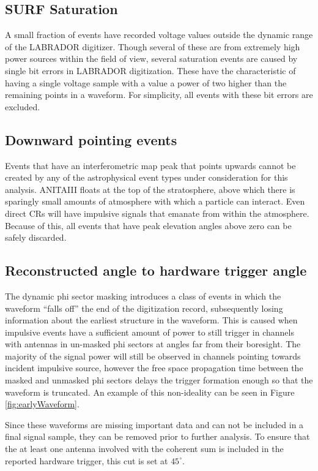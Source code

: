 	\subsection{SURF Saturation}
		A small fraction of events have recorded voltage values outside the dynamic range of the LABRADOR digitizer.  Though several of these are from extremely high power sources within the field of view, several saturation events are caused by single bit errors in LABRADOR digitization.  These have the characteristic of having a single voltage sample with a value a power of two higher than the remaining points in a waveform.  For simplicity, all events with these bit errors are excluded.
		
		
	\subsection{Downward pointing events}
		Events that have an interferometric map peak that points upwards cannot be created by any of the astrophysical event types under consideration for this analysis.  ANITAIII floats at the top of the stratosphere, above which there is sparingly small amounts of atmosphere with which a particle can interact.  Even direct CRs will have impulsive signals that emanate from within the atmosphere.  Because of this, all events that have peak elevation angles above zero can be safely discarded.
		
	
	\subsection{Reconstructed angle to hardware trigger angle}
		The dynamic phi sector masking introduces a class of events in which the waveform ``falls off'' the end of the digitization record, subsequently losing information about the earliest structure in the waveform.  This is caused when impulsive events have a sufficient amount of power to still trigger in channels with antennas in un-masked phi sectors at angles far from their boresight.  The majority of the signal power will still be observed in channels pointing towards incident impulsive source, however the free space propagation time between the masked and unmasked phi sectors delays the trigger formation enough so that the waveform is truncated.  An example of this non-ideality can be seen in Figure \ref{fig:earlyWaveform}.
		
		Since these waveforms are missing important data and can not be included in a final signal sample, they can be removed prior to further analysis.  To ensure that the at least one antenna involved with the coherent sum is included in the reported hardware trigger, this cut is set at $45^\circ$.
		
